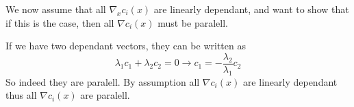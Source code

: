 We now assume that all $\nabla_x c_i(x)$ are linearly dependant, and want to show that if this is the case, then all $\nabla c_i(x)$ must be paralell.

If we have two dependant vectors, they can be written as
$$ \lambda_1 c_1+\lambda_2 c_2 = 0  \rightarrow c_1 = -\frac{\lambda_2}{\lambda_1}c_2 $$
So indeed they are paralell.
By assumption all $\nabla c_i(x)$ are linearly dependant thus all $ \nabla c_i(x)$ are paralell.